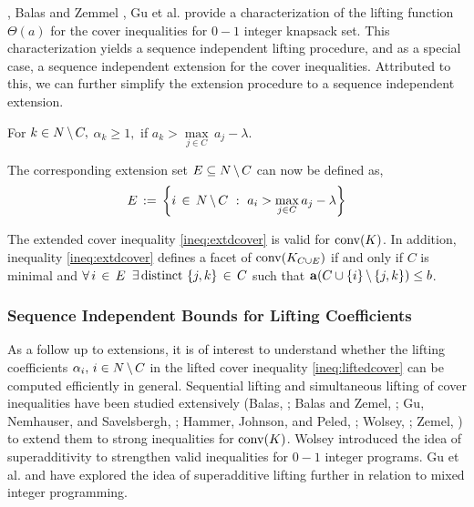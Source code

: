 \documentclass[10pt,twoside]{amsart}
\begin{document}
\atam \cite{Atamturk2005}, Balas and Zemmel \cite{Balas1978}, Gu et al. \cite{Gu2000} provide a characterization of the lifting function $\Theta(a)$ for the cover inequalities for $0-1$ integer knapsack set. This characterization yields a sequence independent lifting procedure, and as a special case, a sequence independent extension for the cover inequalities. Attributed to this, we can further simplify the extension procedure to a sequence independent extension.
\begin{cor}
\label{cor:ext}
  For $k\in N\,\backslash\, C,$ $\alpha_k \geq 1,$ if $a_k > \underset{j\in C}{\max}\, a_j - \lambda$.
\end{cor}

The corresponding extension set $E \subseteq N\,\backslash\, C$ can now be defined as,
\begin{align}
\label{set:ext}
        E \,:=\, \left\{ {i\,\in\, N\,\backslash\, C} \ : \ {a_i > \underset{j\in C}{\max}\, a_j - \lambda} \right\}
\end{align}

\begin{prop}
  The extended cover inequality \eqref{ineq:extdcover} is valid for $\operatorname{conv}(K)$. In addition, inequality \eqref{ineq:extdcover} defines a facet of $\operatorname{conv}(K_{C\cup E})$ if and only if $C$ is minimal and $\forall\, i\,\in\, E$ $\exists\, \text{distinct }\{j,k\}\,\in\, C$ such that $\mathbf{a}(C\cup \{i\}\,\backslash\, \{j,k\}) \leq b$.
\end{prop}

\subsubsection{Sequence Independent Bounds for Lifting Coefficients}\hfill\label{sec:seqindp}

 As a follow up to extensions, it is of interest to understand whether the lifting coefficients $\alpha_i,\,i\in N\,\backslash\, C$ in the lifted cover inequality \eqref{ineq:liftedcover} can be computed efficiently in general. Sequential lifting and simultaneous lifting of cover inequalities have been studied extensively (Balas, \cite{Balas1975}; Balas and Zemel, \cite{Balas1978,Balas1984}; Gu, Nemhauser, and Savelsbergh, \cite{Gu1998,Gu1999a}; Hammer, Johnson, and Peled, \cite{Hammer1975}; Wolsey, \cite{Wolsey1975}; Zemel, \cite{Zemel89}) to extend them to strong inequalities for $\operatorname{conv}(K)$. Wolsey \cite{Wolsey77} introduced the idea of superadditivity to strengthen valid inequalities for $0-1$ integer programs. Gu et al. \cite{Gu2000} and \atam \cite{Atamturk04} have explored the idea of superadditive lifting further in relation to mixed integer programming.
\end{document}
